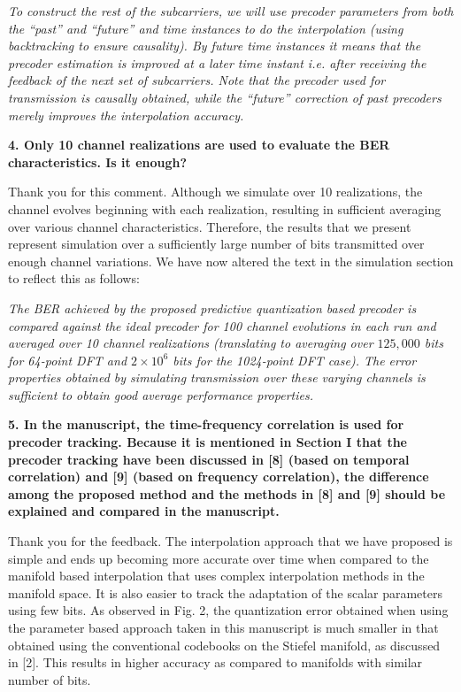 \documentclass[12pt]{letter}
\begin{document}
\emph{To construct the rest of the subcarriers, we will use
precoder parameters from both the ``past'' and ``future'' and time
instances to do the interpolation (using backtracking to ensure
causality). By future time instances it means that the precoder
estimation is improved at a later time instant i.e. after receiving
the feedback of the next set of subcarriers. Note that the precoder
used for transmission is causally obtained, while the ``future''
correction of past precoders merely improves the interpolation
accuracy.}

\textbf{4. Only 10 channel realizations are used to evaluate the BER characteristics. Is it enough?}

Thank you for this comment. Although we simulate over 10 realizations,
the channel evolves beginning with each realization, resulting in
sufficient averaging over various channel characteristics. Therefore,
the results that we present represent simulation over a sufficiently
large number of bits transmitted over enough channel variations. We
have now altered the text in the simulation section to reflect this as
follows:

\emph{The BER achieved by the proposed predictive quantization based
  precoder is compared against the ideal precoder for 100 channel
  evolutions in each run and averaged over 10 channel realizations
  (translating to averaging over $125,000$ bits for 64-point DFT and
  $2\times 10^6$ bits for the 1024-point DFT case). The error
  properties obtained by simulating transmission over these varying
  channels is sufficient to obtain good average performance
  properties.}

\textbf{5. In the manuscript, the time-frequency correlation is used for precoder tracking. Because it is mentioned in Section I that the precoder tracking have been discussed in [8] (based on temporal correlation) and [9] (based on frequency correlation), the difference among the proposed method and the methods in [8] and [9] should be explained and compared in the manuscript.}

Thank you for the feedback. The interpolation approach that we have
proposed is simple and ends up becoming more accurate over time when
compared to the manifold based interpolation that uses complex
interpolation methods in the manifold space. It is also easier to
track the adaptation of the scalar parameters using few bits. As
observed in Fig. 2, the quantization error obtained when using the
parameter based approach taken in this manuscript is much smaller in
that obtained using the conventional codebooks on the Stiefel
manifold, as discussed in [2]. This results in higher accuracy as
compared to manifolds with similar number of bits.
\end{document}
